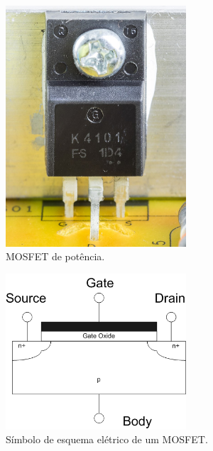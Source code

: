 \documentclass[12pt]{article}
\begin{document}
        \begin{figure}[h]
            
            \centering
            \includegraphics[width=0.6\textwidth]{./images/Dell_Professional_P2212H_-_power_supply_board_-_K4101FS-2149.jpg}
            \caption{MOSFET de potência.} 

        \end{figure}

        \begin{figure}[h]
            
            \centering
            \includegraphics[width=0.6\textwidth]{./images/FET_cross_section.png}
            \caption{Símbolo de esquema elétrico de um MOSFET.}

        \end{figure}
\end{document}
